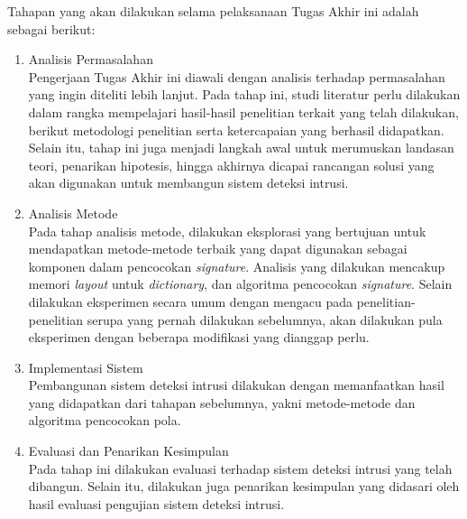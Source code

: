   Tahapan yang akan dilakukan selama pelaksanaan Tugas Akhir ini adalah sebagai berikut:
  \begin{enumerate}

      \item Analisis Permasalahan \\
      Pengerjaan Tugas Akhir ini diawali dengan analisis terhadap permasalahan yang ingin diteliti lebih lanjut. Pada tahap ini, studi literatur perlu dilakukan dalam rangka mempelajari hasil-hasil penelitian terkait yang telah dilakukan, berikut metodologi penelitian serta ketercapaian yang berhasil didapatkan. Selain itu, tahap ini juga menjadi langkah awal untuk merumuskan landasan teori, penarikan hipotesis, hingga akhirnya dicapai rancangan solusi yang akan digunakan untuk membangun sistem deteksi intrusi.

      \item Analisis Metode \\
      Pada tahap analisis metode, dilakukan eksplorasi yang bertujuan untuk mendapatkan metode-metode terbaik yang dapat digunakan sebagai komponen dalam pencocokan \emph{signature}. Analisis yang dilakukan mencakup memori \emph{layout} untuk \emph{dictionary}, dan algoritma pencocokan \emph{signature}. Selain dilakukan eksperimen secara umum dengan mengacu pada penelitian-penelitian serupa yang pernah dilakukan sebelumnya, akan dilakukan pula eksperimen dengan beberapa modifikasi yang dianggap perlu.

      \item Implementasi Sistem \\
      Pembangunan sistem deteksi intrusi dilakukan dengan memanfaatkan hasil yang didapatkan dari tahapan sebelumnya, yakni metode-metode dan algoritma pencocokan pola.

      \item Evaluasi dan Penarikan Kesimpulan \\
      Pada tahap ini dilakukan evaluasi terhadap sistem deteksi intrusi yang telah dibangun. Selain itu, dilakukan juga penarikan kesimpulan yang didasari oleh hasil evaluasi pengujian sistem deteksi intrusi.

  \end{enumerate}


%  

%  
